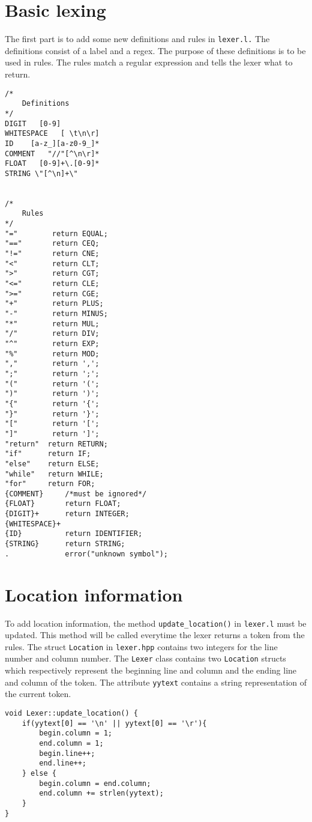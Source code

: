 \documentclass{report}
\begin{document}
	\section{Basic lexing}
	The first part is to add some new definitions and rules in \texttt{lexer.l.} The definitions consist of a label and a regex. The purpose of these definitions is to be used in rules. The rules match a regular expression and tells the lexer what to return.
	\begin{lstlisting}
/*
	Definitions	
*/
DIGIT	[0-9]
WHITESPACE   [ \t\n\r]
ID    [a-z_][a-z0-9_]*
COMMENT   "//"[^\n\r]*
FLOAT   [0-9]+\.[0-9]*
STRING \"[^\n]+\"


/*
	Rules
*/
"="        return EQUAL;
"=="       return CEQ;
"!="       return CNE;
"<"        return CLT;
">"        return CGT;
"<="       return CLE;
">="       return CGE;
"+"        return PLUS;
"-"        return MINUS;
"*"        return MUL;
"/"        return DIV;
"^"        return EXP;
"%"        return MOD;
","        return ',';
";"        return ';';
"("        return '(';
")"        return ')';
"{"        return '{';
"}"        return '}';
"["        return '[';
"]"        return ']';
"return"  return RETURN;
"if"      return IF;
"else"    return ELSE;
"while"   return WHILE;
"for"     return FOR;
{COMMENT}     /*must be ignored*/
{FLOAT}       return FLOAT;
{DIGIT}+      return INTEGER;
{WHITESPACE}+       
{ID}          return IDENTIFIER;
{STRING}      return STRING;
.             error("unknown symbol");
	\end{lstlisting}
	\section{Location information}
	To add location information, the method \texttt{update\_location()} in \texttt{lexer.l} must be updated. This method will be called everytime the lexer returns a token from the rules. The struct \texttt{Location} in \texttt{lexer.hpp} contains two integers for the line number and column number. The \texttt{Lexer} class contains two \texttt{Location} structs which respectively represent the beginning line and column and the ending line and column of the token. The attribute \texttt{yytext} contains a string representation of the current token.
	\begin{lstlisting}
void Lexer::update_location() {
	if(yytext[0] == '\n' || yytext[0] == '\r'){
		begin.column = 1; 
		end.column = 1;
		begin.line++; 
		end.line++;
	} else {
		begin.column = end.column;
		end.column += strlen(yytext);
	}
}	
	\end{lstlisting}
\end{document}
